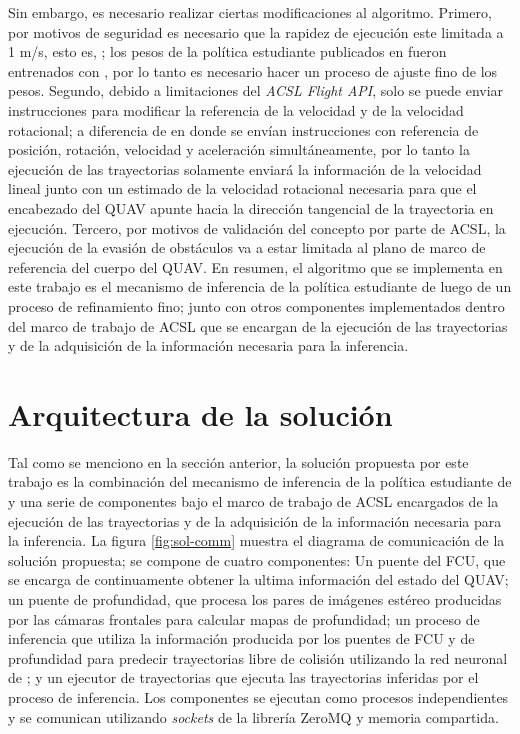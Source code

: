 Sin embargo, es necesario realizar ciertas modificaciones al algoritmo. Primero, por motivos de seguridad es necesario que la rapidez de ejecución este limitada a 1 m/s, esto es, ; los pesos de la política estudiante publicados en \cite{Loquercio2021} fueron entrenados con , por lo tanto es necesario hacer un proceso de ajuste fino de los pesos. Segundo, debido a limitaciones del \textit{ACSL Flight API}, solo se puede enviar instrucciones para modificar la referencia de la velocidad y de la velocidad rotacional; a diferencia de \cite{Loquercio2021} en donde se envían instrucciones con referencia de posición, rotación, velocidad y aceleración simultáneamente, por lo tanto la ejecución de las trayectorias solamente enviará la información de la velocidad lineal junto con un estimado de la velocidad rotacional necesaria para que el encabezado del QUAV apunte hacia la dirección tangencial de la trayectoria en ejecución. Tercero, por motivos de validación del concepto por parte de ACSL, la ejecución de la evasión de obstáculos va a estar limitada al plano  de marco de referencia del cuerpo del QUAV. En resumen, el algoritmo que se implementa en este trabajo es el mecanismo de inferencia de la política estudiante de \cite{Loquercio2021} luego de un proceso de refinamiento fino; junto con otros componentes implementados dentro del marco de trabajo de ACSL que se encargan de la ejecución de las trayectorias y de la adquisición de la información necesaria para la inferencia.

\section{Arquitectura de la solución}

\label{sec:imp-arch}

Tal como se menciono en la sección anterior, la solución propuesta por este trabajo es la combinación del mecanismo de inferencia de la política estudiante de \cite{Loquercio2021} y una serie de componentes bajo el marco de trabajo de ACSL encargados de la ejecución de las trayectorias y de la adquisición de la información necesaria para la inferencia. La figura \ref{fig:sol-comm} muestra el diagrama de comunicación de la solución propuesta; se compone de cuatro componentes: Un puente del FCU, que se encarga de continuamente obtener la ultima información del estado del QUAV; un puente de profundidad, que procesa los pares de imágenes estéreo producidas por las cámaras frontales para calcular mapas de profundidad; un proceso de inferencia que utiliza la información producida por los puentes de FCU y de profundidad para predecir trayectorias libre de colisión utilizando la red neuronal de \cite{Loquercio2021}; y un ejecutor de trayectorias que ejecuta las trayectorias inferidas por el proceso de inferencia. Los componentes se ejecutan como procesos independientes y se comunican utilizando  \textit{sockets} de la librería ZeroMQ \cite{zeroMQ} y memoria compartida.

